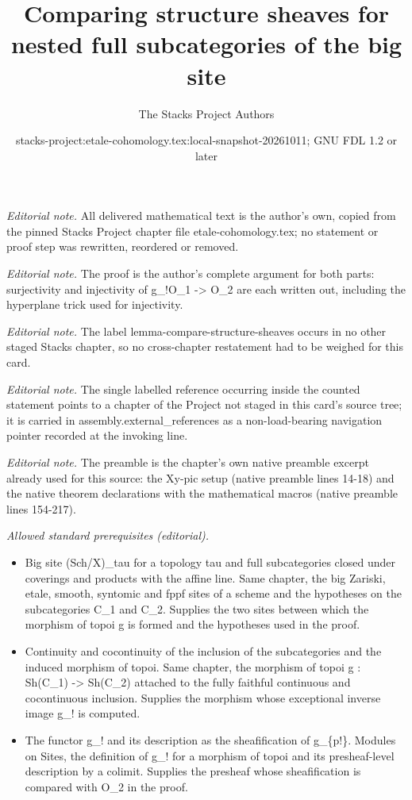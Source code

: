 \documentclass[10pt,a4paper]{amsart}
\title{Comparing structure sheaves for nested full subcategories of the big site}
\author{The Stacks Project Authors}
\date{stacks-project:etale-cohomology.tex:local-snapshot-20261011; GNU FDL 1.2 or later}
\theoremstyle{plain}
\theoremstyle{definition}
\theoremstyle{remark}
\numberwithin{equation}{subsection}
\begin{document}
\maketitle
\noindent\textit{Editorial note.} All delivered mathematical text is the author's own, copied from the pinned Stacks Project chapter file etale-cohomology.tex; no statement or proof step was rewritten, reordered or removed.\par\medskip
\noindent\textit{Editorial note.} The proof is the author's complete argument for both parts: surjectivity and injectivity of g\_!O\_1 -> O\_2 are each written out, including the hyperplane trick used for injectivity.\par\medskip
\noindent\textit{Editorial note.} The label lemma-compare-structure-sheaves occurs in no other staged Stacks chapter, so no cross-chapter restatement had to be weighed for this card.\par\medskip
\noindent\textit{Editorial note.} The single labelled reference occurring inside the counted statement points to a chapter of the Project not staged in this card's source tree; it is carried in assembly.external\_references as a non-load-bearing navigation pointer recorded at the invoking line.\par\medskip
\noindent\textit{Editorial note.} The preamble is the chapter's own native preamble excerpt already used for this source: the Xy-pic setup (native preamble lines 14-18) and the native theorem declarations with the mathematical macros (native preamble lines 154-217).\par\medskip
\noindent\textit{Allowed standard prerequisites (editorial).}\begin{itemize}
\item Big site (Sch/X)\_tau for a topology tau and full subcategories closed under coverings and products with the affine line. Same chapter, the big Zariski, etale, smooth, syntomic and fppf sites of a scheme and the hypotheses on the subcategories C\_1 and C\_2. Supplies the two sites between which the morphism of topoi g is formed and the hypotheses used in the proof.
\item Continuity and cocontinuity of the inclusion of the subcategories and the induced morphism of topoi. Same chapter, the morphism of topoi g : Sh(C\_1) -> Sh(C\_2) attached to the fully faithful continuous and cocontinuous inclusion. Supplies the morphism whose exceptional inverse image g\_! is computed.
\item The functor g\_! and its description as the sheafification of g\_\{p!\}. Modules on Sites, the definition of g\_! for a morphism of topoi and its presheaf-level description by a colimit. Supplies the presheaf whose sheafification is compared with O\_2 in the proof.
\end{itemize}\medskip
\end{document}
